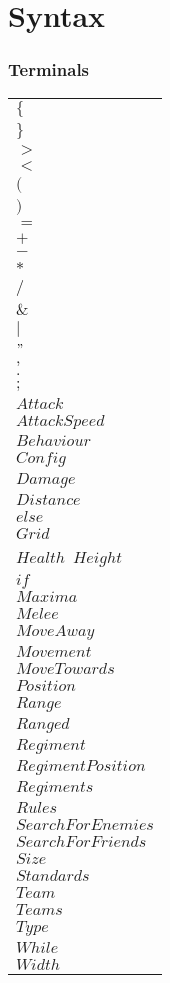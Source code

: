 \section{Syntax}
	\subsubsection{Terminals}
		\begin{longtable}[l]{l}
			$\{$\\
			$\}$\\
			$>$\\
			$<$\\
			$($\\
			$)$\\
			$=$\\
			$+$\\
			$-$\\
			$*$\\
			$/$\\
			$\&$\\
			$|$\\
			$"$\\
			$,$\\
			$.$\\
			$;$\\
			$Attack$\\
			$AttackSpeed$\\
			$Behaviour$\\
			$Config$\\
			$Damage$\\
			$Distance$\\
			$else$\\
			$Grid$\\
			$Health$\
			$Height$\\
			$if$\\
			$Maxima$\\
			$Melee$\\
			$MoveAway$\\
			$Movement$\\
			$MoveTowards$\\
			$Position$\\
			$Range$\\
			$Ranged$\\
			$Regiment$\\
			$RegimentPosition$\\
			$Regiments$\\
			$Rules$\\
			$SearchForEnemies$\\
			$SearchForFriends$\\
			$Size$\\
			$Standards$\\
			$Team$\\
			$Teams$\\
			$Type$\\
			$While$\\
			$Width$\\
		\end{longtable}
